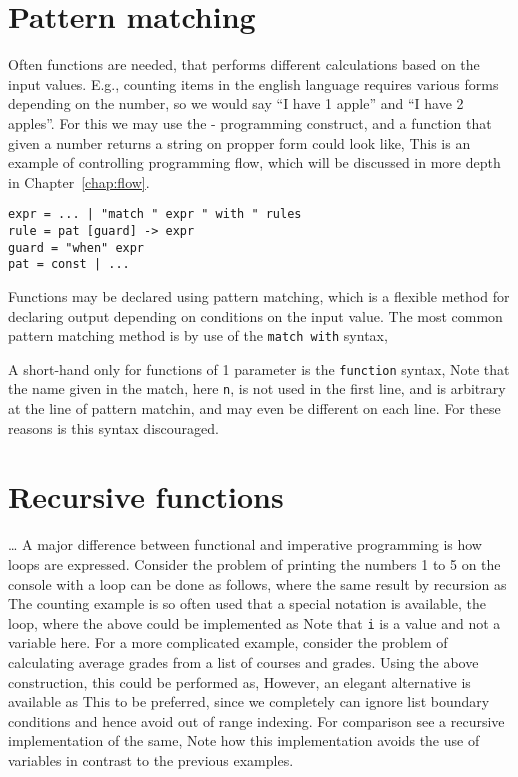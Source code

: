 \section{Pattern matching}
Often functions are needed, that performs different calculations based on the input values. E.g., counting items in the english language requires various forms depending on the number, so we would say ``I have 1 apple'' and ``I have 2 apples''. For this we may use the - programming construct, and a function that given a number returns a string on propper form could look like,
%
%
This is an example of controlling programming flow, which will be discussed in more depth in Chapter~\ref{chap:flow}.
\begin{lstlisting}[language=ebnf]
expr = ... | "match " expr " with " rules 
rule = pat [guard] -> expr
guard = "when" expr
pat = const | ...     
\end{lstlisting}

Functions may be declared using pattern matching, which is a flexible method for declaring output depending on conditions on the input value. The most common pattern matching method is by use of the \texttt{match with} syntax,

A short-hand only for functions of 1 parameter is the \texttt{function} syntax,
Note that the name given in the match, here \texttt{n}, is not used in the first line, and is arbitrary at the line of pattern matchin, and may even be different on each line. For these reasons is this syntax discouraged.

\section{Recursive functions}

\dots
A major difference between functional and imperative programming is how loops are expressed. Consider the problem of printing the numbers 1 to 5 on the console with a  loop can be done as follows,
where the same result by recursion as
The counting example is so often used that a special notation is available, the  loop, where the above could be implemented as
Note that \texttt{i} is a value and not a variable here. For a more complicated example, consider the problem of calculating average grades from a list of courses and grades. Using the above construction, this could be performed as,
However, an elegant alternative is available as
This to be preferred, since we completely can ignore list boundary conditions and hence avoid out of range indexing. For comparison see a recursive implementation of the same,
Note how this implementation avoids the use of variables in contrast to the previous examples.



